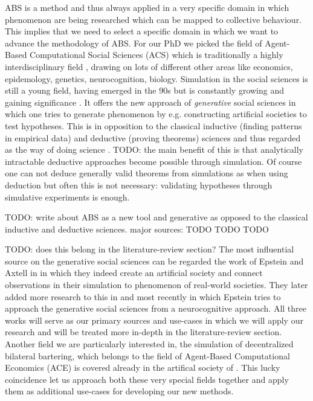 ABS is a method and thus always applied in a very specific domain in which phenomenon are being researched which can be mapped to collective behaviour. This implies that we need to select a specific domain in which we want to advance the methodology of ABS. For our PhD we picked the field of Agent-Based Computational Social Sciences (ACS) which is traditionally a highly interdisciplinary field \cite{axelrod_chapter_2006}, drawing on lots of different other areas like economics, epidemology, genetics, neurocognition, biology. Simulation in the social sciences is still a young field, having emerged in the 90s but is constantly growing and gaining significance \cite{axelrod_advancing_1997}. It offers the new approach of \textit{generative} social sciences in which one tries to generate phenomenon by e.g. constructing artificial societies to test hypotheses. This is in opposition to the classical inductive (finding patterns in empirical data) and deductive (proving theorems) sciences and thus regarded as the way of doing science \cite{axelrod_advancing_1997}. 
TODO: the main benefit of this is that analytically intractable deductive approaches become possible through simulation. Of course one can not deduce generally valid theorems from simulations as when using deduction but often this is not necessary: validating hypotheses through simulative experiments is enough.

TODO: write about ABS as a new tool and  generative as opposed to the classical inductive and deductive sciences. major sources: 
TODO \cite{axtell_aligning_1996}
TODO \cite{epstein_chapter_2006}
TODO \cite{epstein_generative_2012}

TODO: does this belong in the literature-review section?
The most influential source on the generative social sciences can be regarded the work of Epstein and Axtell in \cite{epstein_growing_1996} in which they indeed create an artificial society and connect observations in their simulation to phenomenon of real-world societies. They later added more research to this in \cite{epstein_generative_2012} and most recently \cite{epstein_agent_zero:_2014} in which Epstein tries to approach the generative social sciences from a neurocognitive approach. All three works will serve as our primary sources and use-cases in which we will apply our research and will be treated more in-depth in the literature-review section. Another field we are particularly interested in, the simulation of decentralized bilateral bartering, which belongs to the field of Agent-Based Computational Economics (ACE) \cite{tesfatsion_agent-based_2006} is covered already in the artifical society of \cite{epstein_growing_1996}. This lucky coincidence let us approach both these very special fields together and apply them as additional use-cases for developing our new methods. 

